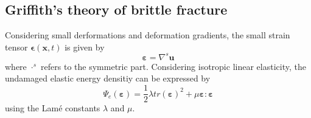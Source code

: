 \subsection{Griffith's theory of brittle fracture} \label{sec:formul_Griffith}
Considering small derformations and deformation gradients, the small strain tensor $\mathbf{\epsilon}\left(\mathbf{x},t\right)$ is given by
\begin{equation}
	\bm{\varepsilon} = \nabla^{s}\mathbf{u}
\end{equation}
where $\cdot^{s}$ refers to the symmetric part. Considering isotropic linear elasticity, the undamaged elastic energy densitiy can be expressed by
\begin{equation}
	\Psi_ {e}\left(\bm{\varepsilon}\right) = \dfrac{1}{2}\lambda tr\left(\bm{\varepsilon}\right)^{2}+\mu\bm{\varepsilon}:\bm{\varepsilon}
\end{equation}
using the Lam\'{e} constants $\lambda$ and $\mu$.